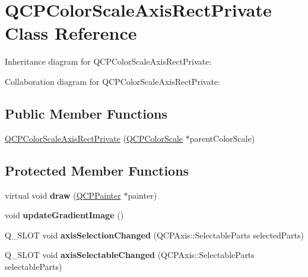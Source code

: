 \hypertarget{classQCPColorScaleAxisRectPrivate}{}\section{Q\+C\+P\+Color\+Scale\+Axis\+Rect\+Private Class Reference}
\label{classQCPColorScaleAxisRectPrivate}


Inheritance diagram for Q\+C\+P\+Color\+Scale\+Axis\+Rect\+Private\+:


Collaboration diagram for Q\+C\+P\+Color\+Scale\+Axis\+Rect\+Private\+:
\subsection*{Public Member Functions}
\begin{DoxyCompactItemize}
\item 
\hyperlink{classQCPColorScaleAxisRectPrivate_ad3b242f75dd2b33581364a4e668a80db}{Q\+C\+P\+Color\+Scale\+Axis\+Rect\+Private} (\hyperlink{classQCPColorScale}{Q\+C\+P\+Color\+Scale} $\ast$parent\+Color\+Scale)
\end{DoxyCompactItemize}
\subsection*{Protected Member Functions}
\begin{DoxyCompactItemize}
\item 
virtual void {\bfseries draw} (\hyperlink{classQCPPainter}{Q\+C\+P\+Painter} $\ast$painter)\hypertarget{classQCPColorScaleAxisRectPrivate_adb67bfe9057a9dd9a85f548c274e6d98}{}\label{classQCPColorScaleAxisRectPrivate_adb67bfe9057a9dd9a85f548c274e6d98}

\item 
void {\bfseries update\+Gradient\+Image} ()\hypertarget{classQCPColorScaleAxisRectPrivate_a73754cab312aeaddea1bfcc67cc079ac}{}\label{classQCPColorScaleAxisRectPrivate_a73754cab312aeaddea1bfcc67cc079ac}

\item 
Q\+\_\+\+S\+L\+OT void {\bfseries axis\+Selection\+Changed} (Q\+C\+P\+Axis\+::\+Selectable\+Parts selected\+Parts)\hypertarget{classQCPColorScaleAxisRectPrivate_a6112ad4291ac1695d37659cb049d598d}{}\label{classQCPColorScaleAxisRectPrivate_a6112ad4291ac1695d37659cb049d598d}

\item 
Q\+\_\+\+S\+L\+OT void {\bfseries axis\+Selectable\+Changed} (Q\+C\+P\+Axis\+::\+Selectable\+Parts selectable\+Parts)\hypertarget{classQCPColorScaleAxisRectPrivate_a66d2baed86966bb03a6d7c32dc7d59f7}{}\label{classQCPColorScaleAxisRectPrivate_a66d2baed86966bb03a6d7c32dc7d59f7}

\end{DoxyCompactItemize}
